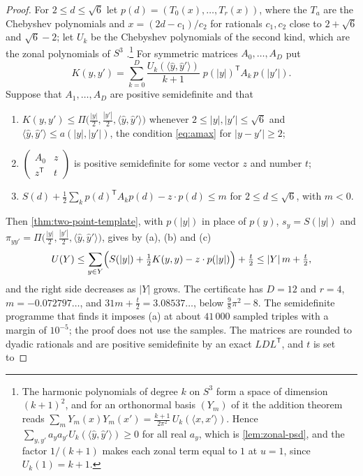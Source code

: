 \documentclass[11pt,reqno]{amsart}
\renewcommand{\_}{\origunderscore\allowbreak}
\numberwithin{equation}{section}
\theoremstyle{plain}
\theoremstyle{definition}
\theoremstyle{remark}
\begin{document}
\begin{proof}
For $2\le d\le\sqrt6$ let $p(d)=(T_0(x),\dots,T_r(x))$, where the $T_a$ are
the Chebyshev polynomials and $x=(2d-c_1)/c_2$ for rationals $c_1,c_2$ close
to $2+\sqrt6$ and $\sqrt6-2$; let $U_k$ be the Chebyshev polynomials of the
second kind, which are the zonal polynomials of $S^3$
\cite{DGS77}.\footnote{The harmonic polynomials of degree $k$ on $S^3$
  form a space of dimension $(k+1)^2$, and for an orthonormal basis $(Y_m)$
  of it the addition theorem reads
  $\sum_mY_m(x)Y_m(x')=\frac{k+1}{2\pi^2}\,U_k(\langle x,x'\rangle)$.
  Hence $\sum_{y,y'}a_ya_{y'}U_k(\langle\hat y,\hat y'\rangle)\ge0$ for all
  real $a_y$, which is \cref{lem:zonal-psd}, and the
  factor $1/(k+1)$ makes each zonal term equal to $1$ at $u=1$, since
  $U_k(1)=k+1$.} For
symmetric matrices $A_0,\dots,A_D$ put
\[
  K(y,y')=\sum_{k=0}^{D}\frac{U_k(\langle\hat y,\hat y'\rangle)}{k+1}\;
  p(|y|)^{\mathsf T}A_k\,p(|y'|).
\]
Suppose that $A_1,\dots,A_D$ are positive semidefinite and that
\begin{enumerate}[label=\textup{(\alph*)},leftmargin=2.2em]
\item $K(y,y')\le\Pi\bigl(\frac{|y|}2,\frac{|y'|}2,\langle\hat y,\hat y'\rangle\bigr)$
  whenever $2\le|y|,|y'|\le\sqrt6$ and
  $\langle\hat y,\hat y'\rangle\le a(|y|,|y'|)$, the condition \eqref{eq:amax}
  for $|y-y'|\ge2$;
\item $\begin{pmatrix}A_0&z\\ z^{\mathsf T}&t\end{pmatrix}$ is positive
  semidefinite for some vector $z$ and number $t$;
\item $S(d)+\frac12\sum_kp(d)^{\mathsf T}A_kp(d)-z\cdot p(d)\le m$ for
  $2\le d\le\sqrt6$, with $m<0$.
\end{enumerate}
Then \cref{thm:two-point-template}, with $p(|y|)$ in place of $p(y)$,
$s_y=S(|y|)$ and
$\pi_{yy'}=\Pi\bigl(\frac{|y|}2,\frac{|y'|}2,\langle\hat y,\hat y'\rangle\bigr)$,
gives by (a), (b) and (c)
\[
  U(Y)\le\sum_{y\in Y}\Bigl(S(|y|)+\tfrac12K(y,y)-z\cdot p(|y|)\Bigr)+\tfrac t2
  \le|Y|\,m+\tfrac t2 ,
\]
and the right side decreases as $|Y|$ grows. The certificate has $D=12$ and
$r=4$, $m=-0.072797\ldots$, and $31m+\frac t2=3.08537\ldots$, below
$\frac98\pi^2-8$. The semidefinite programme that finds it imposes (a) at
about $41\,000$ sampled triples with a margin of $10^{-5}$; the proof does not
use the samples. The matrices are rounded to dyadic rationals and are
positive semidefinite by an exact $LDL^{\mathsf T}$, and $t$ is set to

\end{proof}
\end{document}
